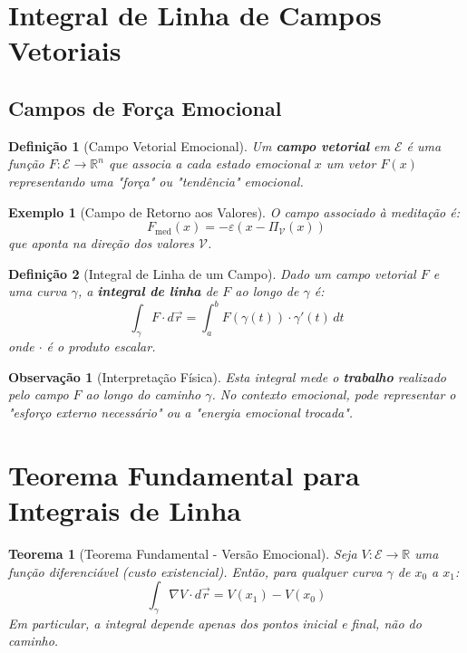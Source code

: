 \documentclass[12pt, a4paper]{article}
\newtheorem{definition}{Definição}
\newtheorem{theorem}{Teorema}
\newtheorem{example}{Exemplo}
\newtheorem{remark}{Observação}
\begin{document}
\section{Integral de Linha de Campos Vetoriais}

\subsection{Campos de Força Emocional}

\begin{definition}[Campo Vetorial Emocional]
Um \textbf{campo vetorial} em $\mathcal{E}$ é uma função $F: \mathcal{E} \to \mathbb{R}^n$ que associa a cada estado emocional $x$ um vetor $F(x)$ representando uma "força" ou "tendência" emocional.
\end{definition}

\begin{example}[Campo de Retorno aos Valores]
O campo associado à meditação é:
\[
F_{\text{med}}(x) = -\varepsilon (x - \Pi_{\mathcal{V}}(x))
\]
que aponta na direção dos valores $\mathcal{V}$.
\end{example}

\begin{definition}[Integral de Linha de um Campo]
Dado um campo vetorial $F$ e uma curva $\gamma$, a \textbf{integral de linha} de $F$ ao longo de $\gamma$ é:
\[
\int_\gamma F \cdot d\vec{r} = \int_a^b F(\gamma(t)) \cdot \gamma'(t) \, dt
\]
onde $\cdot$ é o produto escalar.
\end{definition}

\begin{remark}[Interpretação Física]
Esta integral mede o \textbf{trabalho} realizado pelo campo $F$ ao longo do caminho $\gamma$. No contexto emocional, pode representar o "esforço externo necessário" ou a "energia emocional trocada".
\end{remark}

\section{Teorema Fundamental para Integrais de Linha}

\begin{theorem}[Teorema Fundamental - Versão Emocional]
Seja $V: \mathcal{E} \to \mathbb{R}$ uma função diferenciável (custo existencial). Então, para qualquer curva $\gamma$ de $x_0$ a $x_1$:
\[
\int_\gamma \nabla V \cdot d\vec{r} = V(x_1) - V(x_0)
\]
Em particular, a integral depende apenas dos pontos inicial e final, não do caminho.
\end{theorem}
\end{document}
